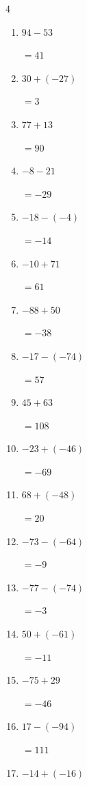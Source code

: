 \begin{multicols}{4}
\begin{enumerate}
        $=-110$

  \item $94-53$

        $=41$

  \item $30+(-27)$

        $=3$

  \item $77+13$

        $=90$

  \item $-8-21$

        $=-29$

\columnbreak %

  \item $-18-(-4)$

        $=-14$

  \item $-10+71$

        $=61$

  \item $-88+50$

        $=-38$

  \item $-17-(-74)$

        $=57$

  \item $45+63$

        $=108$

  \item $-23+(-46)$

        $=-69$

  \item $68+(-48)$

        $=20$

  \item $-73-(-64)$

        $=-9$

  \item $-77-(-74)$

        $=-3$

  \item $50+(-61)$

        $=-11$

  \item $-75+29$

        $=-46$

  \item $17-(-94)$

        $=111$

  \item $-14+(-16)$


\end{enumerate}
\end{multicols}
